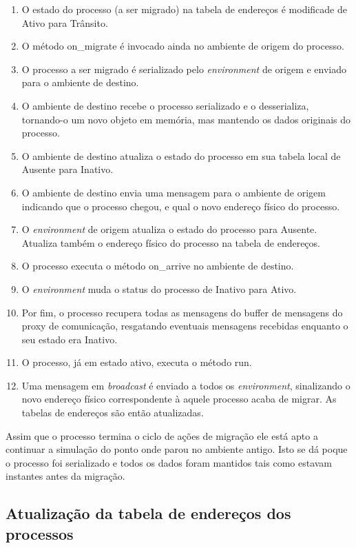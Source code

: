 \begin{enumerate}
\item O estado do processo (a ser migrado) na tabela de endereços é modificade de Ativo para Trânsito.
\item O método on\_migrate é invocado ainda no ambiente de origem do processo.
\item O processo a ser migrado é serializado pelo \textit{environment} de origem e enviado para o ambiente de destino.
\item O ambiente de destino recebe o processo serializado e o desserializa, tornando-o um novo objeto em memória, mas mantendo os dados originais do processo.
\item O ambiente de destino atualiza o estado do processo em sua tabela local de Ausente para Inativo.
\item O ambiente de destino envia uma mensagem para o ambiente de origem indicando que o processo chegou, e qual o novo endereço físico do processo.
\item O \textit{environment} de origem atualiza o estado do processo para Ausente. Atualiza também o endereço físico do processo na tabela de endereços.
\item O processo executa o método on\_arrive no ambiente de destino.
\item O \textit{environment} muda o status do processo de Inativo para Ativo.
\item Por fim, o processo recupera todas as mensagens do buffer de mensagens do proxy de comunicação, resgatando eventuais mensagens recebidas enquanto o seu estado era Inativo.
\item O processo, já em estado ativo, executa o método run.
\item Uma mensagem em \textit{broadcast} é enviado a todos os \textit{environment}, sinalizando o novo endereço físico correspondente à aquele processo acaba de migrar. As tabelas de endereços são então atualizadas.
\end{enumerate}

Assim que o processo termina o ciclo de ações de migração ele está apto a continuar a simulação do ponto onde parou no ambiente antigo. Isto se dá poque o processo foi serializado e todos os dados foram mantidos tais como estavam instantes antes da migração.

\subsection{Atualização da tabela de endereços dos processos \label{atualizacao}}

